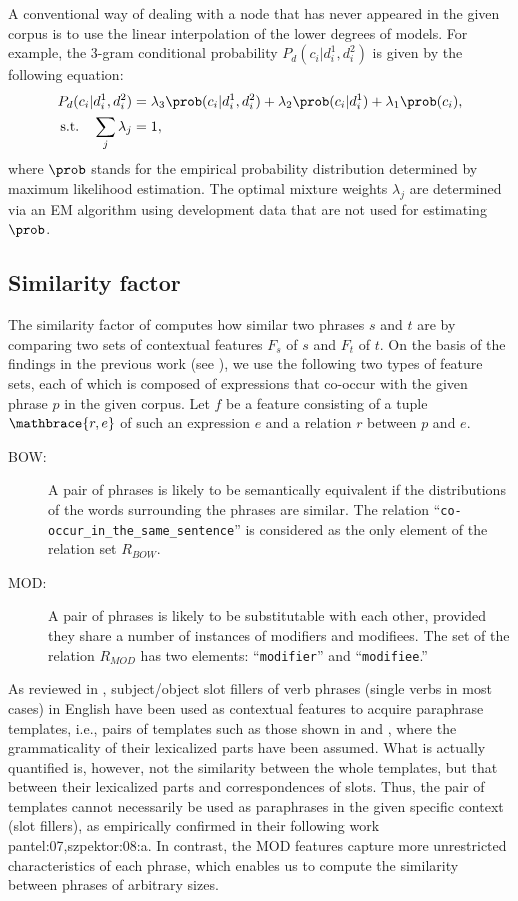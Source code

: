 \documentclass[english]{jnlp_1.4}
\renewcommand{\cite}{}
\begin{document}
A conventional way of dealing with a node that has never appeared in
the given corpus is to use the linear interpolation of the lower
degrees of models.
For example, the 3-gram conditional probability
$P_{d}(c_{i}|d_{i}^{1},d_{i}^{2})$ is given by the following equation:
\begin{align*}
 P_{d}(c_{i}|d_{i}^{1},d_{i}^{2}) 
   & = \lambda_{3}\prob(c_{i}|d_{i}^{1},d_{i}^{2})
	+\lambda_{2}\prob(c_{i}|d_{i}^{1})
	+\lambda_{1}\prob(c_{i}),
	\\
 \text{s.t.}\quad \sum_{j}\lambda_{j} 
   &= 1,
\end{align*}
where $\prob$ stands for the empirical probability distribution
determined by maximum likelihood estimation.  The optimal mixture
weights $\lambda_{j}$ are determined via an EM algorithm using
development data that are not used for estimating $\prob$.

\subsection{Similarity factor}
\label{ssec:similarity}

The similarity factor of  computes how similar two phrases
$s$ and $t$ are by comparing two sets of contextual features $F_{s}$
of $s$ and $F_{t}$ of $t$.
On the basis of the findings in the previous work (see
), we use the following two types of feature sets, each
of which is composed of expressions that co-occur with the given
phrase $p$ in the given corpus.  Let $f$ be a feature consisting of a
tuple $\mathbrace{r,e}$ of such an expression $e$ and a relation $r$
between $p$ and $e$.
\begin{description}
\item[BOW:] A pair of phrases is likely to be semantically equivalent
  if the distributions of the words surrounding the phrases are
  similar.  The relation
  ``\texttt{co-occur\_in\_the\_same\_sentence}'' is considered as the
  only element of the relation set $R_{\mathit{BOW}}$.
\item[MOD:] A pair of phrases is likely to be substitutable with each
  other, provided they share a number of instances of modifiers and
  modifiees.  The set of the relation $R_{\mathit{MOD}}$ has two
  elements: ``\texttt{modifier}'' and ``\texttt{modifiee}.''
\end{description}

As reviewed in , subject/object slot fillers of verb
phrases (single verbs in most cases) in English have been used as
contextual features to acquire paraphrase templates, i.e., pairs of
templates such as those shown in  and
, where the grammaticality of their lexicalized
parts have been assumed.
What is actually quantified is, however, not the similarity between
the whole templates, but that between their lexicalized parts and
correspondences of slots.  Thus, the pair of templates cannot
necessarily be used as paraphrases in the given specific context (slot
fillers), as empirically confirmed in their following work
\cite{pantel:07,szpektor:08:a}.
In contrast, the MOD features capture more unrestricted
characteristics of each phrase, which enables us to compute the
similarity between phrases of arbitrary sizes.
\end{document}
